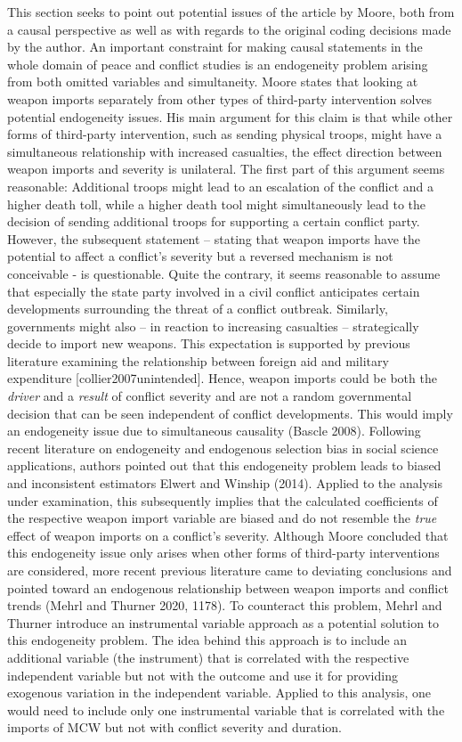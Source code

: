 \documentclass[
]{article}
\begin{document}
This section seeks to point out potential issues of the article by
Moore, both from a causal perspective as well as with regards to the
original coding decisions made by the author. An important constraint
for making causal statements in the whole domain of peace and conflict
studies is an endogeneity problem arising from both omitted variables
and simultaneity. Moore states that looking at weapon imports separately
from other types of third-party intervention solves potential
endogeneity issues. His main argument for this claim is that while other
forms of third-party intervention, such as sending physical troops,
might have a simultaneous relationship with increased casualties, the
effect direction between weapon imports and severity is unilateral. The
first part of this argument seems reasonable: Additional troops might
lead to an escalation of the conflict and a higher death toll, while a
higher death tool might simultaneously lead to the decision of sending
additional troops for supporting a certain conflict party. However, the
subsequent statement -- stating that weapon imports have the potential
to affect a conflict's severity but a reversed mechanism is not
conceivable - is questionable. Quite the contrary, it seems reasonable
to assume that especially the state party involved in a civil conflict
anticipates certain developments surrounding the threat of a conflict
outbreak. Similarly, governments might also -- in reaction to increasing
casualties -- strategically decide to import new weapons. This
expectation is supported by previous literature examining the
relationship between foreign aid and military expenditure
{[}collier2007unintended{]}. Hence, weapon imports could be both the
\emph{driver} and a \emph{result} of conflict severity and are not a
random governmental decision that can be seen independent of conflict
developments. This would imply an endogeneity issue due to simultaneous
causality (Bascle 2008). Following recent literature on endogeneity and
endogenous selection bias in social science applications, authors
pointed out that this endogeneity problem leads to biased and
inconsistent estimators Elwert and Winship (2014). Applied to the
analysis under examination, this subsequently implies that the
calculated coefficients of the respective weapon import variable are
biased and do not resemble the \emph{true} effect of weapon imports on a
conflict's severity. Although Moore concluded that this endogeneity
issue only arises when other forms of third-party interventions are
considered, more recent previous literature came to deviating
conclusions and pointed toward an endogenous relationship between weapon
imports and conflict trends (Mehrl and Thurner 2020, 1178). To
counteract this problem, Mehrl and Thurner introduce an instrumental
variable approach as a potential solution to this endogeneity problem.
The idea behind this approach is to include an additional variable (the
instrument) that is correlated with the respective independent variable
but not with the outcome and use it for providing exogenous variation in
the independent variable. Applied to this analysis, one would need to
include only one instrumental variable that is correlated with the
imports of MCW but not with conflict severity and duration.
\end{document}
